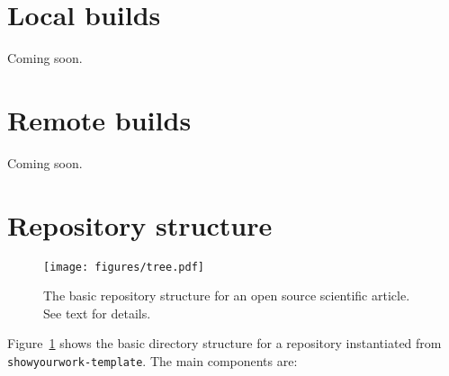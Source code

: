 \documentclass[twocolumn]{aastex631}
\begin{document}
\section{Local builds}
\label{sec:local-builds}
%
Coming soon.

\section{Remote builds}
\label{sec:remote-builds}
%
Coming soon.

\section{Repository structure}
\label{sec:struct}
%
\begin{figure}[ht!]
    \begin{centering}
        \texttt{[image: figures/tree.pdf]}
        \caption{
            The basic repository structure for an open source scientific article.
            See text for details.
        }
        \label{fig:tree}
    \end{centering}
\end{figure}
%
Figure~\ref{fig:tree} shows the basic directory structure for a repository instantiated from \texttt{showyourwork-template}. 
The main components are:
\end{document}
